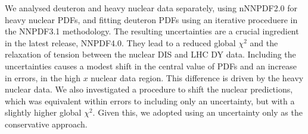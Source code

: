We analysed deuteron and heavy nuclear data separately, using nNNPDF2.0 for heavy nuclear PDFs, and fitting deuteron PDFs using an iterative proceduere in the NNPDF3.1 methodology. The resulting uncertainties are a crucial ingredient in the latest release, NNPDF4.0. They lead to a reduced global $\chi^2$ and the relaxation of tension between the nuclear DIS and LHC DY data. Including the uncertainties causes a modest shift in the central value of PDFs and an increase in errors, in the high $x$ nuclear data region. This difference is driven by the heavy nuclear data. We also investigated a procedure to shift the nuclear predictions, which was equivalent within errors to including only an uncertainty, but with a slightly higher global $\chi^2$. Given this, we adopted using an uncertainty only as the conservative approach. 


\label{sec:summandoutlook}
